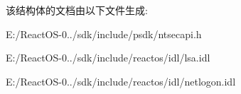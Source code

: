 该结构体的文档由以下文件生成\+:\begin{DoxyCompactItemize}
\item 
E\+:/\+React\+O\+S-\/0../sdk/include/psdk/ntsecapi.\+h\item 
E\+:/\+React\+O\+S-\/0../sdk/include/reactos/idl/lsa.\+idl\item 
E\+:/\+React\+O\+S-\/0../sdk/include/reactos/idl/netlogon.\+idl\end{DoxyCompactItemize}
